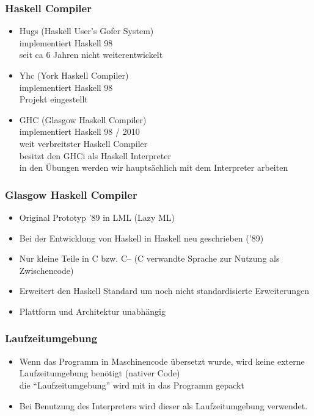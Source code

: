 \begin{frame}
\frametitle{Haskell Compiler}
\begin{block}{\vspace*{-3ex}}
\begin{itemize}
  \item Hugs (Haskell User's Gofer System) \\ implementiert Haskell 98 \\ seit ca 6 Jahren nicht weiterentwickelt
  \item Yhc (York Haskell Compiler) \\ implementiert Haskell 98 \\ Projekt eingestellt
  \item GHC (Glasgow Haskell Compiler) \\ implementiert Haskell 98 / 2010 \\ weit verbreitster Haskell Compiler \\ 
  besitzt den GHCi als Haskell Interpreter \\ in den Übungen werden wir hauptsächlich mit dem Interpreter arbeiten
\end{itemize}
\end{block}
\end{frame}

\begin{frame}
\frametitle{Glasgow Haskell Compiler}
\begin{block}{\vspace*{-3ex}}
\begin{itemize}
  \item Original Prototyp '89 in LML (Lazy ML) 
  \item Bei der Entwicklung von Haskell in Haskell neu geschrieben ('89)
  \item Nur kleine Teile in C bzw. C-- (C verwandte Sprache zur Nutzung als Zwischencode)
  \item Erweitert den Haskell Standard um noch nicht standardisierte Erweiterungen
  \item Plattform und Architektur unabhängig
\end{itemize}
\end{block}
\end{frame}

\begin{frame}
\frametitle{Laufzeitumgebung}
\begin{block}{\vspace*{-3ex}}
\begin{itemize}
  \item Wenn das Programm in Maschinencode übersetzt wurde, wird keine externe Laufzeitumgebung benötigt (nativer Code)\\
  		die "`Laufzeitumgebung"' wird mit in das Programm gepackt
  \item Bei Benutzung des Interpreters wird dieser als Laufzeitumgebung verwendet.
\end{itemize}
\end{block}
\end{frame}

